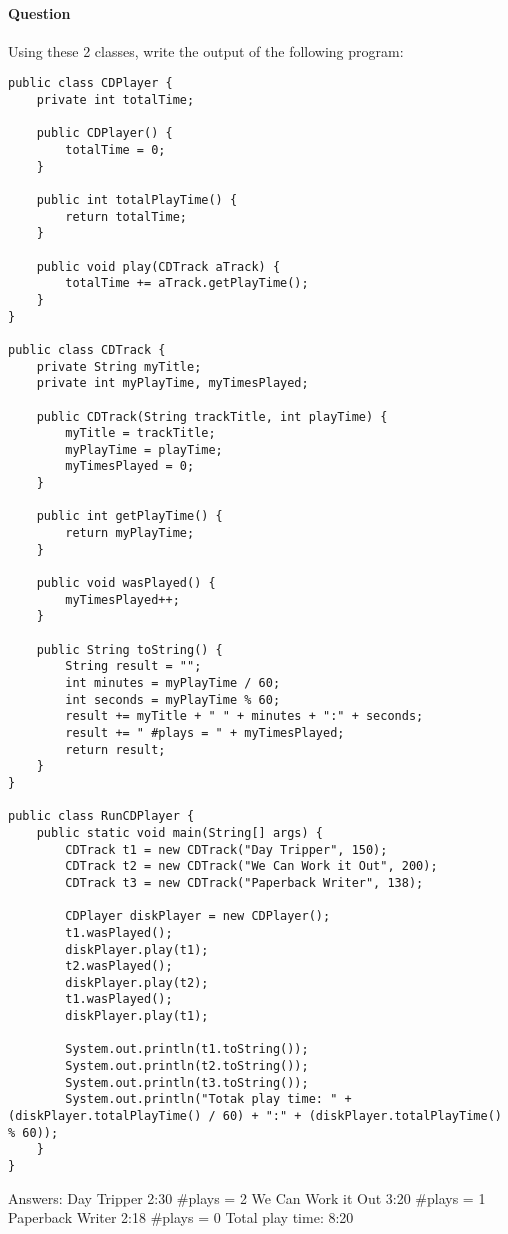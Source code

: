 \documentclass{article}
\begin{document}
\paragraph{Question }
Using these 2 classes, write the output of the following program:
\begin{lstlisting}
public class CDPlayer {
	private int totalTime;

	public CDPlayer() {
		totalTime = 0;
	}

	public int totalPlayTime() {
		return totalTime;
	}

	public void play(CDTrack aTrack) {
		totalTime += aTrack.getPlayTime();
	}
}

public class CDTrack {
	private String myTitle;
	private int myPlayTime, myTimesPlayed;

	public CDTrack(String trackTitle, int playTime) {
		myTitle = trackTitle;
		myPlayTime = playTime;
		myTimesPlayed = 0;
	}

	public int getPlayTime() {
		return myPlayTime;
	}

	public void wasPlayed() {
		myTimesPlayed++;
	}

	public String toString() {
		String result = "";
		int minutes = myPlayTime / 60;
		int seconds = myPlayTime % 60;
		result += myTitle + " " + minutes + ":" + seconds;
		result += " #plays = " + myTimesPlayed;
		return result;
	}
}

public class RunCDPlayer {
	public static void main(String[] args) {
		CDTrack t1 = new CDTrack("Day Tripper", 150);
		CDTrack t2 = new CDTrack("We Can Work it Out", 200);
		CDTrack t3 = new CDTrack("Paperback Writer", 138);

		CDPlayer diskPlayer = new CDPlayer();
		t1.wasPlayed();
		diskPlayer.play(t1);
		t2.wasPlayed();
		diskPlayer.play(t2);
		t1.wasPlayed();
		diskPlayer.play(t1);

		System.out.println(t1.toString());
		System.out.println(t2.toString());
		System.out.println(t3.toString());
		System.out.println("Totak play time: " + (diskPlayer.totalPlayTime() / 60) + ":" + (diskPlayer.totalPlayTime() % 60));
	}
}
\end{lstlisting}
{\color{red}Answers:
\newline Day Tripper 2:30 \#plays = 2
\newline We Can Work it Out 3:20 \#plays = 1
\newline Paperback Writer 2:18 \#plays = 0
\newline Total play time: 8:20}
\end{document}
